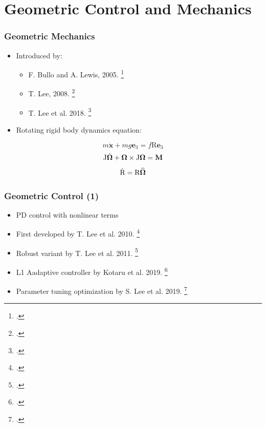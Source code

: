\section{Geometric Control and Mechanics}

\begin{frame}
	\frametitle{Geometric Mechanics}
	
	\begin{itemize}
		\item Introduced by:
		\begin{itemize}
			\item F. Bullo and A. Lewis, 2005. \footcite{bulloBook}
			\item T. Lee, 2008. \footcite{Lee2008ComputationalGM}
			\item T. Lee et al. 2018. \footcite{LeeModel} 
		\end{itemize}
	
	\end{itemize}
	\begin{itemize}
		\item Rotating rigid body dynamics equation:
	\end{itemize}	
	\begin{equation}
		m \ddot{\textbf{x}} + m g\textbf{e}_3 = f\text{R}\textbf{e}_3 \label{model1}
	\end{equation}
	\begin{equation}
		\text{J}\dot{\boldsymbol{\Omega}} + \boldsymbol{\Omega} \times \text{J}\boldsymbol{\Omega} = \textbf{M} \label{model2}
	\end{equation}
	\begin{equation}                       
		\dot{\text{R}} = \text{R}\widehat{\boldsymbol{\Omega}} \label{model3}
	\end{equation}
	
\end{frame}

\begin{frame}
	\frametitle{Geometric Control (1)}

	\begin{itemize}
		\item PD control with nonlinear terms
		\item First developed by T. Lee et al. 2010. \footcite{LeeClanak4}
		\item Robust variant by T. Lee et al. 2011. \footcite{LeeClanak3}
		\item L1 Aadaptive controller by Kotaru et al. 2019. \footcite{Kotaru2019GeometricLA}
		\item Parameter tuning optimization by S. Lee et al. 2019. \footcite{Lee 2019}
	\end{itemize}
\end{frame}

